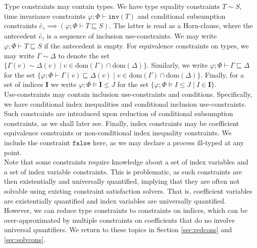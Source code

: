 Type constraints may contain types. We have type equality constraints $T \sim S$, time invariance constraints $\varphi;\Phi\vdash \texttt{inv}(T)$ and conditional subsumption constraints $\widetilde{c_\gamma} \implies (\varphi;\Phi\vdash T \sqsubseteq S)$. The latter is read as a Horn-clause, where the antecedent $\widetilde{c_\gamma}$ is a sequence of inclusion use-constraints. We may write $\varphi;\Phi\vdash T \sqsubseteq S$ if the antecedent is empty. For equivalence constraints on types, we may write $\Gamma \sim \Delta$ to denote the set $\{ \Gamma(v) \sim \Delta(v) \mid v \in \text{dom}(\Gamma) \cap \text{dom}(\Delta) \}$. Similarly, we write $\varphi;\Phi\vdash \Gamma \sqsubseteq \Delta$ for the set $\{\varphi;\Phi\vdash \Gamma(v) \sqsubseteq \Delta(v) \mid v \in \text{dom}(\Gamma) \cap \text{dom}(\Delta)\}$. Finally, for a set of indices $\mathbf{I}$ we write $\varphi;\Phi\vDash \mathbf{I} \leq J$ for the set $\{ \varphi;\Phi\vDash I \leq J \mid I \in \mathbf{I}\}$. \\

Use-constraints may contain inclusion use-constraints and conditions. Specifically, we have conditional index inequalities and conditional inclusion use-constraints. Such constraints are introduced upon reduction of conditional subsumption constraints, as we shall later see. Finally, index constraints may be coefficient equivalence constraints or non-conditional index inequality constraints. We include the constraint $\texttt{false}$ here, as we may declare a process ill-typed at any point.\\
 
Note that some constraints require knowledge about a set of index variables and a set of index variable constraints. This is problematic, as such constraints are then existentially and universally quantified, implying that they are often not solvable using existing constraint satisfaction solvers. That is, coefficient variables are existentially quantified and index variables are universally quantified. However, we can reduce type constraints to constraints on indices, which can be over-approximated by multiple constraints on coefficients that do no involve universal quantifiers. We return to these topics in Section \ref{sec:redcons} and \ref{sec:solvcons}.\\


